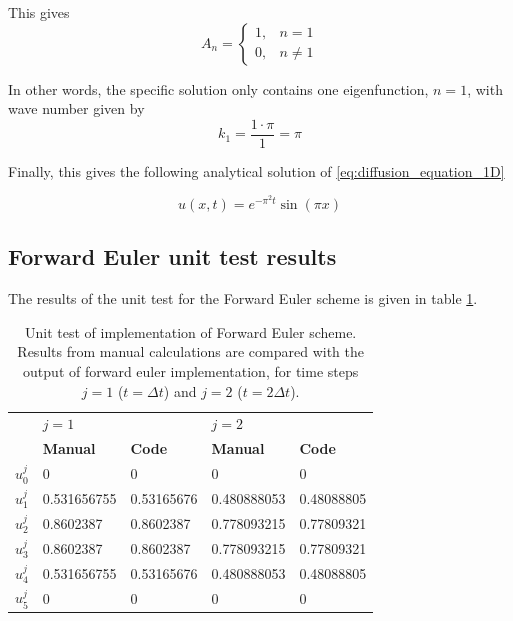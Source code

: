 \documentclass[12pt]{extarticle}
\begin{document}
This gives
\[ A_n = \begin{cases}
	1, & n=1 \\
	0, & n\ne 1
\end{cases} \]

In other words, the specific solution only contains one eigenfunction, $n=1$, with wave number given by
\[ k_1 = \frac{1\cdot \pi}{1} = \pi \]

Finally, this gives the following analytical solution of \eqref{eq:diffusion_equation_1D}

\[ u(x,t) = e^{-\pi^2 t} \sin(\pi x) \]

\subsection{Forward Euler unit test results} \label{app:unit_test}
The results of the unit test for the Forward Euler scheme is given in table \ref{tab:unit_test}.  
\begin{table}[h]
	\centering
	\begin{tabular}{l|ll|ll|}
		\cline{2-5}
		& \multicolumn{2}{l|}{\textbf{$j=1$}}                 & \multicolumn{2}{l|}{\textbf{$j=2$}}                  \\ \cline{2-5} 
		& \multicolumn{1}{l|}{\textbf{Manual}} & \textbf{Code} & \multicolumn{1}{l|}{\textbf{Manual}} & \textbf{Code} \\ \hline
		\multicolumn{1}{|l|}{$u_0^j$} & \multicolumn{1}{l|}{0}               & 0             & \multicolumn{1}{l|}{0}               & 0             \\ \hline
		\multicolumn{1}{|l|}{$u_1^j$} & \multicolumn{1}{l|}{0.531656755}     & 0.53165676    & \multicolumn{1}{l|}{0.480888053}     & 0.48088805    \\ \hline
		\multicolumn{1}{|l|}{$u_2^j$} & \multicolumn{1}{l|}{0.8602387}       & 0.8602387     & \multicolumn{1}{l|}{0.778093215}     & 0.77809321    \\ \hline
		\multicolumn{1}{|l|}{$u_3^j$} & \multicolumn{1}{l|}{0.8602387}       & 0.8602387     & \multicolumn{1}{l|}{0.778093215}     & 0.77809321    \\ \hline
		\multicolumn{1}{|l|}{$u_4^j$} & \multicolumn{1}{l|}{0.531656755}     & 0.53165676    & \multicolumn{1}{l|}{0.480888053}     & 0.48088805    \\ \hline
		\multicolumn{1}{|l|}{$u_5^j$} & \multicolumn{1}{l|}{0}               & 0             & \multicolumn{1}{l|}{0}               & 0             \\ \hline
	\end{tabular}
	\caption{Unit test of implementation of Forward Euler scheme. Results from manual calculations are compared with the output of forward euler implementation, for time steps $j=1$ ($t = \Delta t$) and $j=2$ ($t = 2\Delta t$).}
	\label{tab:unit_test}
\end{table}




\end{document}
